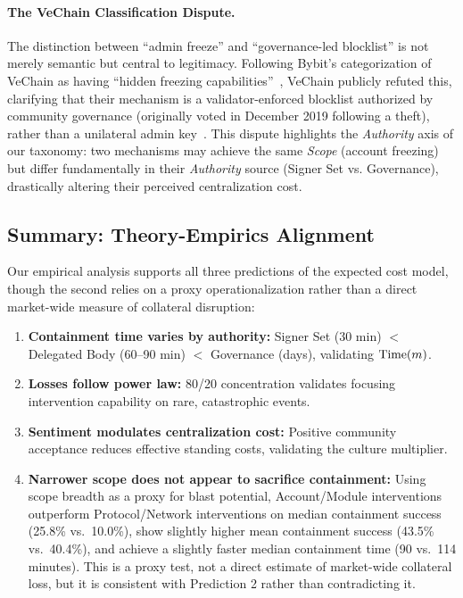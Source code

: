 \documentclass[12pt]{article}
\begin{document}
\paragraph{The VeChain Classification Dispute.}
The distinction between ``admin freeze'' and ``governance-led blocklist'' is not merely semantic but central to legitimacy. Following Bybit's categorization of VeChain as having ``hidden freezing capabilities''~\cite{ByBit2025SecurityReport}, VeChain publicly refuted this, clarifying that their mechanism is a validator-enforced blocklist authorized by community governance (originally voted in December 2019 following a theft), rather than a unilateral admin key~\cite{VeChain2025Refutation}. This dispute highlights the \emph{Authority} axis of our taxonomy: two mechanisms may achieve the same \emph{Scope} (account freezing) but differ fundamentally in their \emph{Authority} source (Signer Set vs. Governance), drastically altering their perceived centralization cost.


\subsection{Summary: Theory-Empirics Alignment}
\label{subsec:validation-summary}

Our empirical analysis supports all three predictions of the expected cost model, though the second relies on a proxy operationalization rather than a direct market-wide measure of collateral disruption:
\begin{enumerate}
    \item \textbf{Containment time varies by authority:} Signer Set (30 min) $<$ Delegated Body (60--90 min) $<$ Governance (days), validating $\mathrm{Time}(m)$.
    \item \textbf{Losses follow power law:} 80/20 concentration validates focusing intervention capability on rare, catastrophic events.
    \item \textbf{Sentiment modulates centralization cost:} Positive community acceptance reduces effective standing costs, validating the culture multiplier.
    \item \textbf{Narrower scope does not appear to sacrifice containment:} Using scope breadth as a proxy for blast potential, Account/Module interventions outperform Protocol/Network interventions on median containment success (25.8\% vs.\ 10.0\%), show slightly higher mean containment success (43.5\% vs.\ 40.4\%), and achieve a slightly faster median containment time (90 vs.\ 114 minutes). This is a proxy test, not a direct estimate of market-wide collateral loss, but it is consistent with Prediction 2 rather than contradicting it.
\end{enumerate}
\end{document}
